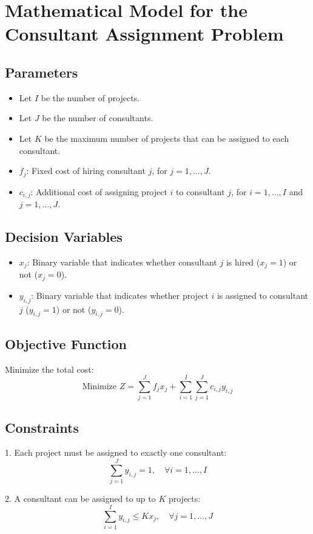 \documentclass{article}
\begin{document}
\section*{Mathematical Model for the Consultant Assignment Problem}

\subsection*{Parameters}
\begin{itemize}
    \item Let $I$ be the number of projects.
    \item Let $J$ be the number of consultants.
    \item Let $K$ be the maximum number of projects that can be assigned to each consultant.
    \item $f_j$: Fixed cost of hiring consultant $j$, for $j = 1, \ldots, J$.
    \item $c_{i,j}$: Additional cost of assigning project $i$ to consultant $j$, for $i = 1, \ldots, I$ and $j = 1, \ldots, J$.
\end{itemize}

\subsection*{Decision Variables}
\begin{itemize}
    \item $x_{j}$: Binary variable that indicates whether consultant $j$ is hired ($x_j = 1$) or not ($x_j = 0$).
    \item $y_{i,j}$: Binary variable that indicates whether project $i$ is assigned to consultant $j$ ($y_{i,j} = 1$) or not ($y_{i,j} = 0$).
\end{itemize}

\subsection*{Objective Function}
Minimize the total cost:
\[
\text{Minimize } Z = \sum_{j=1}^{J} f_j x_j + \sum_{i=1}^{I} \sum_{j=1}^{J} c_{i,j} y_{i,j}
\]

\subsection*{Constraints}
1. Each project must be assigned to exactly one consultant:
\[
\sum_{j=1}^{J} y_{i,j} = 1, \quad \forall i = 1, \ldots, I
\]

2. A consultant can be assigned to up to $K$ projects:
\[
\sum_{i=1}^{I} y_{i,j} \leq K x_j, \quad \forall j = 1, \ldots, J
\]
\end{document}
